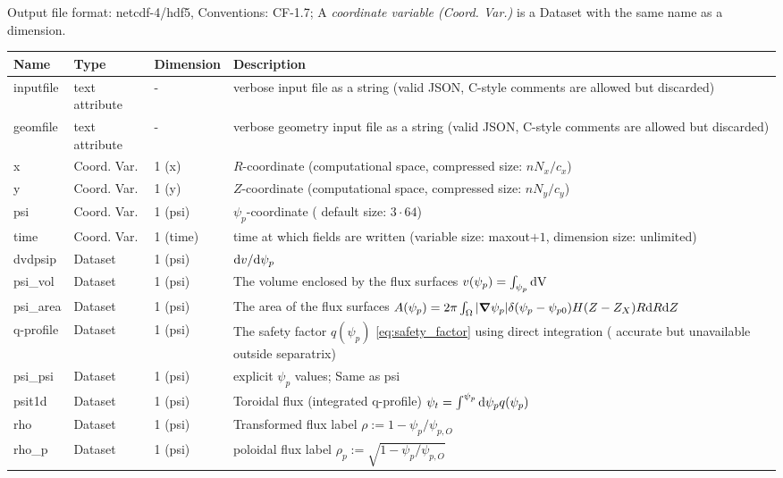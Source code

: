 Output file format: netcdf-4/hdf5, Conventions: CF-1.7; A \textit{coordinate variable (Coord. Var.)} is a Dataset with the same name as a dimension.

\begin{longtable}{lll>{\RaggedRight}p{7cm}}
\toprule
\rowcolor{gray!50}\textbf{Name} &  \textbf{Type} & \textbf{Dimension} & \textbf{Description}  \\ \midrule
inputfile  &     text attribute & - & verbose input file as a string (valid JSON, C-style comments are allowed but discarded) \\
geomfile   &     text attribute & - & verbose geometry input file as a string (valid JSON, C-style comments are allowed but discarded) \\
x                & Coord. Var. & 1 (x) & $R$-coordinate (computational space, compressed size: $nN_x/c_x$)\\
y                & Coord. Var. & 1 (y) & $Z$-coordinate (computational space, compressed size: $nN_y/c_y$)\\
psi              & Coord. Var. & 1 (psi) & $\psi_p$-coordinate ( default size: $3\cdot 64$) \\
time             & Coord. Var. & 1 (time)& time at which fields are written (variable size: maxout$+1$, dimension size: unlimited) \\
dvdpsip          & Dataset & 1 (psi) & $\mathrm{d} v/\mathrm{d}\psi_p$ \\
psi\_vol         & Dataset & 1 (psi) & The volume enclosed by the flux surfaces $v(\psi_p) = \int_{\psi_p} \mathrm{dV}\, $ \\
psi\_area        & Dataset & 1 (psi) & The area of the flux surfaces $A(\psi_p) = 2\pi \int_\Omega |{\boldsymbol{\nabla}}\psi_p| \delta(\psi_p - \psi_{p0}) H(Z-Z_X) R\mathrm{d} R\mathrm{d} Z$ \\
q-profile        & Dataset & 1 (psi) & The safety factor $q(\psi_p)$ \eqref{eq:safety_factor} using direct integration ( accurate but unavailable outside separatrix) \\
psi\_psi         & Dataset & 1 (psi) & explicit $\psi_p$ values; Same as psi \\
psit1d           & Dataset & 1 (psi) & Toroidal flux (integrated q-profile) $\psi_t = \int^{\psi_p} \mathrm{d}\psi_p q(\psi_p)$ \\
rho              & Dataset & 1 (psi) & Transformed flux label $\rho:= 1 - \psi_p/\psi_{p,O}$ \\
rho\_p           & Dataset & 1 (psi) & poloidal flux label $\rho_p:= \sqrt{1 - \psi_p/\psi_{p,O}}$ \\

\end{longtable}
